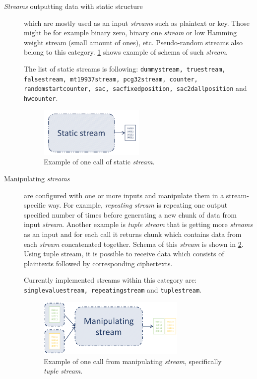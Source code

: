 \documentclass[
    digital,    %
    oneside,    %
    color,
    11pt,
    nocover,
    notable,
    nolof,
    nolot,
    final
]{fithesis3}
\renewcommand\_{\textunderscore\allowbreak}
\begin{document}
\begin{description}
	\item[\textit{Streams} outputting data with static structure] which are mostly used as an input \textit{streams} such as plaintext or key. Those might be for example binary zero, binary one \textit{stream} or low Hamming weight stream (small amount of ones), etc. Pseudo-random streams also belong to this category. \cref{fig:static-stream} shows example of schema of such \textit{stream}.
	
	The list of static streams is following:  \texttt{dummy\_stream, true\_stream, false\_stream, mt19937\_stream, pcg32\_stream, counter, random\_start\_counter, sac, sac\_fixed\_position, sac\_2d\_all\_position} and \texttt{hw\_counter}. 

	
	\begin{figure}[h]
		\centering
		\includegraphics[width=0.5\textwidth]{./images/pictures/static-stream.png}
		\caption{Example of one call of static \textit{stream}.}
		\label{fig:static-stream}
	\end{figure}

	\item[Manipulating \textit{streams}] are configured with one or more inputs and manipulate them in a stream-specific way. For example, \textit{repeating stream} is repeating one output specified number of times before generating a new chunk of data from input \textit{stream}. Another example is \textit{tuple stream} that is getting more \textit{streams} as an input and for each call it returns chunk which contains data from each \textit{stream} concatenated together. Schema of this \textit{stream} is shown in \cref{fig:manipulating-stream}. Using tuple stream, it is possible to receive data which consists of plaintexts followed by corresponding ciphertexts.
	
	Currently implemented streams within this category are: \texttt{ single\_value\_stream, repeating\_stream} and \texttt{tuple\_stream}.
	
	\begin{figure}[h]
		\centering
		\includegraphics[width=0.7\textwidth]{./images/pictures/manipulating-stream.png}
		\caption{Example of one call from manipulating \textit{stream}, specifically \textit{tuple stream}. }
		\label{fig:manipulating-stream}
	\end{figure}
	

\end{description}
\end{document}
